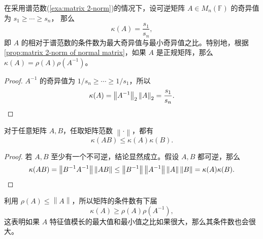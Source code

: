\documentclass[fontset=none,zihao=-4]{Notes}
\newcommand{\norm}[1]{\left\lVert#1\right\rVert}
\begin{document}
\begin{proposition}\label{prop:condition number for matrix 2-norm}
  在采用谱范数(\autoref{exa:matrix 2-norm})的情况下，设可逆矩阵 $A\in M_n(\mathbb{F})$ 的奇异值为 $s_1\geq\cdots\geq s_n$，
  那么
  \[
    \kappa(A)=\frac{s_1}{s_n},  
  \]
  即 $A$ 的相对于谱范数的条件数为最大奇异值与最小奇异值之比。特别地，根据 
  \autoref{prop:matrix 2-norm of normal matrix}，如果 $A$ 是正规矩阵，那么
  $\kappa(A)=\rho(A)\rho(A^{-1})$。
\end{proposition}
\begin{proof}
  $A^{-1}$ 的奇异值为 $1/s_n\geq \cdots\geq 1/s_1$，所以
  \[
    \kappa(A)=\norm{A^{-1}}_2\norm{A}_2=\frac{s_1}{s_n}.\qedhere  
  \]
\end{proof}

\begin{proposition}
  对于任意矩阵 $A,B$，任取矩阵范数 $\norm{\cdot}$，都有
  \[
    \kappa(AB)\leq\kappa(A)\kappa(B).  
  \]
\end{proposition}
\begin{proof}
  若 $A,B$ 至少有一个不可逆，结论显然成立。假设 $A,B$ 都可逆，那么
  \[
    \kappa(AB)=\norm{B^{-1}A^{-1}}\norm{AB}\leq\norm{B^{-1}}\norm{A^{-1}}\norm{A}\norm{B}
    =\kappa(A)\kappa(B).\qedhere  
  \]
\end{proof}

利用 $\rho(A)\leq\norm{A}$，所以矩阵的条件数有下届
\[
  \kappa(A)\geq\rho(A)\rho(A^{-1}),  
\]
这表明如果 $A$ 特征值模长的最大值和最小值之比如果很大，那么其条件数也会很大。
\end{document}
